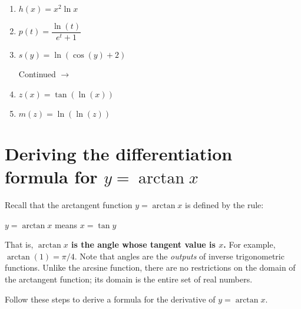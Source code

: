 \documentclass[11pt]{article}
\def\ra{\rightarrow}
\def\pageturn{\vfill 
\begin{flushright}
	\begin{small}
		Continued $\ra$
	\end{small}
\end{flushright} \newpage}
\begin{document}
\begin{enumerate}
	\item $h(x) = x^2 \ln x$
	
	\vspace{1in}
	
	\item $p(t) = \dfrac{\ln(t)}{e^t + 1}$
	
	\vspace{1in}
	\item $s(y) = \ln(\cos(y) + 2)$
	
\pageturn
	
	\item $z(x) = \tan(\ln(x))$
	\vspace{1in}
	
	\item $m(z) = \ln(\ln(z))$
	\vspace{1in}
\end{enumerate}


\section{Deriving the differentiation formula for $y = \arctan x$}

Recall that the arctangent function $y = \arctan x$ is defined by the rule: 
\begin{center}
	$y = \arctan x$ \hspace{0.25in} means \hspace{0.25in} $x = \tan y$
\end{center}
That is, \textbf{$\arctan x$ is the angle whose tangent value is $x$.} For example, $\arctan(1) = \pi/4$. Note that angles are the \emph{outputs} of inverse trigonometric functions. Unlike the arcsine function, there are no restrictions on the domain of the arctangent function; its domain is the entire set of real numbers. 

Follow these steps to derive a formula for the derivative of $y = \arctan x$. 
\end{document}
